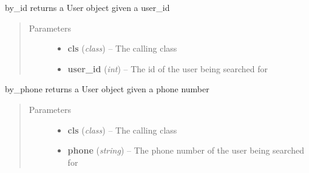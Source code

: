 \documentclass[letterpaper,10pt,english]{sphinxmanual}
\begin{document}
\begin{fulllineitems}

\begin{fulllineitems}
\label{dev-patients:cagenix.patients.models.Patient.by_id}
by\_id returns a User object given a user\_id
\begin{quote}\begin{description}
\item[{Parameters}] \leavevmode\begin{itemize}
\item {} 
\textbf{cls} (\emph{class}) -- The calling class

\item {} 
\textbf{user\_id} (\emph{int}) -- The id of the user being searched for

\end{itemize}

\end{description}\end{quote}

\end{fulllineitems}


\begin{fulllineitems}
\label{dev-patients:cagenix.patients.models.Patient.by_phone}
by\_phone returns a User object given a phone number
\begin{quote}\begin{description}
\item[{Parameters}] \leavevmode\begin{itemize}
\item {} 
\textbf{cls} (\emph{class}) -- The calling class

\item {} 
\textbf{phone} (\emph{string}) -- The phone number of the user being searched for

\end{itemize}

\end{description}\end{quote}

\end{fulllineitems}


\end{fulllineitems}
\end{document}
